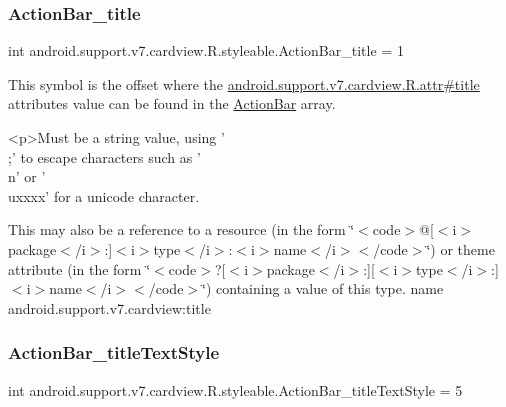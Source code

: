\subsubsection{\texorpdfstring{Action\+Bar\+\_\+title}{ActionBar\_title}}
{\footnotesize\ttfamily int android.\+support.\+v7.\+cardview.\+R.\+styleable.\+Action\+Bar\+\_\+title = 1\hspace{0.3cm}{\ttfamily [static]}}

This symbol is the offset where the \hyperlink{classandroid_1_1support_1_1v7_1_1cardview_1_1R_1_1attr_a152f347649775e5aee3805c09dbbab39}{android.\+support.\+v7.\+cardview.\+R.\+attr\#title} attribute\textquotesingle{}s value can be found in the \hyperlink{classandroid_1_1support_1_1v7_1_1cardview_1_1R_1_1styleable_a0cbf7f776e31f78bb0a2b558daf176f8}{Action\+Bar} array.

\begin{DoxyVerb}      <p>Must be a string value, using '\\;' to escape characters such as '\\n' or '\\uxxxx' for a unicode character.
\end{DoxyVerb}
 

This may also be a reference to a resource (in the form \char`\"{}$<$code$>$@\mbox{[}$<$i$>$package$<$/i$>$\+:\mbox{]}$<$i$>$type$<$/i$>$\+:$<$i$>$name$<$/i$>$$<$/code$>$\char`\"{}) or theme attribute (in the form \char`\"{}$<$code$>$?\mbox{[}$<$i$>$package$<$/i$>$\+:\mbox{]}\mbox{[}$<$i$>$type$<$/i$>$\+:\mbox{]}$<$i$>$name$<$/i$>$$<$/code$>$\char`\"{}) containing a value of this type.  name android.\+support.\+v7.\+cardview\+:title \mbox{\label{classandroid_1_1support_1_1v7_1_1cardview_1_1R_1_1styleable_a4032c4461fdd3a308959f8403e6dd628}} 
\subsubsection{\texorpdfstring{Action\+Bar\+\_\+title\+Text\+Style}{ActionBar\_titleTextStyle}}
{\footnotesize\ttfamily int android.\+support.\+v7.\+cardview.\+R.\+styleable.\+Action\+Bar\+\_\+title\+Text\+Style = 5\hspace{0.3cm}{\ttfamily [static]}}

